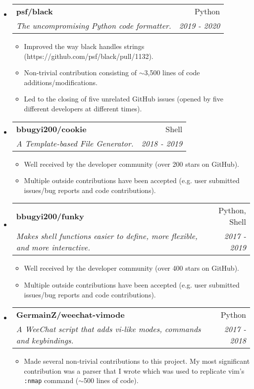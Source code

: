\documentclass[letterpaper,11pt]{article}
\makeatletter
\newcommand{\ressubheading}[4]{
\begin{tabular*}{6.5in}{l@{\cftdotfill{\cftsecdotsep}\extracolsep{\fill}}r}
		\textbf{#1} & #2 \\
		\textit{#3} & \textit{#4} \\
\end{tabular*}\vspace{-6pt}}
\makeatother
\begin{document}
\begin{itemize}
\item \ressubheading{psf/black}{Python}{The uncompromising Python code formatter.}{2019 - 2020}
    \begin{itemize}
        \item
            Improved the way black handles strings (https://github.com/psf/black/pull/1132).
        \item
            Non-trivial contribution consisting of $\sim$3,500 lines of code additions/modifications.
        \item
            Led to the closing of five unrelated GitHub issues (opened by five different developers at different times).
    \end{itemize}
\item \ressubheading{bbugyi200/cookie}{Shell}{A Template-based File Generator.}{2018 - 2019}
    \begin{itemize}
        \item
            Well received by the developer community (over 200 stars on GitHub).
        \item
            Multiple outside contributions have been accepted (e.g. user submitted issues/bug reports and code contributions).
    \end{itemize}
\item \ressubheading{bbugyi200/funky}{Python, Shell}{Makes shell functions easier to define, more flexible, and more interactive.}{2017 - 2019}
    \begin{itemize}
        \item
            Well received by the developer community (over 400 stars on GitHub).
        \item
            Multiple outside contributions have been accepted (e.g. user submitted issues/bug reports and code contributions).
    \end{itemize}
\item \ressubheading{GermainZ/weechat-vimode}{Python}{A WeeChat script that adds vi-like modes, commands and keybindings.}{2017 - 2018}
    \begin{itemize}
        \item
            Made several non-trivial contributions to this project. My most significant contribution was a parser that I wrote which was used to replicate vim's \texttt{:nmap} command ($\sim$500 lines of code).
    \end{itemize}
\end{itemize}
\end{document}

